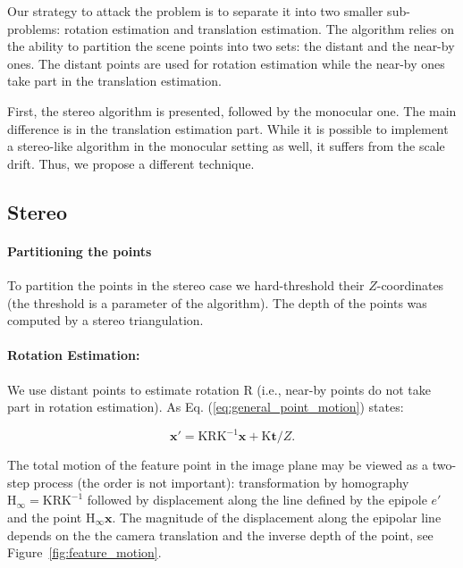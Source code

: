 \documentclass{report}
\begin{document}
Our strategy to attack the problem is to separate it into two smaller
sub-problems: rotation estimation and translation estimation. The
algorithm relies on the ability to partition the scene points into two
sets: the distant and the near-by ones.  The distant points are used
for rotation estimation while the near-by ones take part in the
translation estimation.

First, the stereo algorithm is presented, followed by the monocular
one.  The main difference is in the translation estimation part. While
it is possible to implement a stereo-like algorithm in the monocular
setting as well, it suffers from the scale drift.  Thus, we propose a
different technique.


\subsection{Stereo}\label{sec:stereo_moest}
\paragraph{Partitioning the points} To partition the points in the
stereo case we hard-threshold their $Z$-coordinates (the threshold is
a parameter of the algorithm).  The depth of the points was computed
by a stereo triangulation.

\paragraph{Rotation Estimation:}\label{sec:rotation_estimation}
We use distant points to estimate rotation $\mathrm{R}$ (i.e., near-by
points do not take part in rotation estimation). As Eq.
(\ref{eq:general_point_motion}) states:

\begin{equation}
  \mathbf{x}' = \mathrm{KRK^{-1}}\mathbf{x} + \mathrm{K}\mathbf{t}/Z.
\end{equation}

The total motion of the feature point in the image plane may be viewed
as a two-step process (the order is not important): transformation by
homography $\mathrm{H_\infty} = \mathrm{KRK^{-1}}$ followed by
displacement along the line defined by the epipole $e'$ and the point
$\mathrm{H_\infty}\mathbf{x}$.  The magnitude of the displacement
along the epipolar line depends on the the camera translation and the
inverse depth of the point, see Figure~\ref{fig:feature_motion}.
\end{document}
